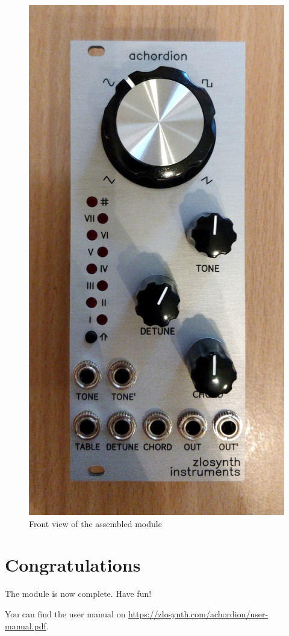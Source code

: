 \documentclass[10pt,a4paper,twocolumn]{article}
\begin{document}
\begin{figure}[p]
  \centering
  \includegraphics[width=\linewidth]{p12.jpg}
  \caption{Front view of the assembled module}
\end{figure}

\section{Congratulations}

The module is now complete. Have fun!

You can find the user manual on \url{https://zlosynth.com/achordion/user-manual.pdf}.
\end{document}

